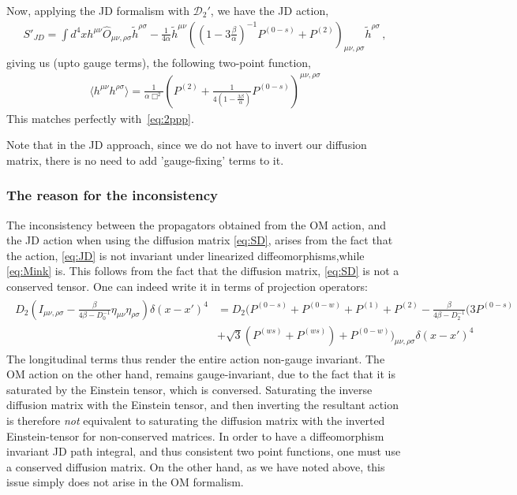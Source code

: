 \documentclass[aps,preprintnumbers,superscriptaddress,longbibliography]{revtex4-1}
\begin{document}
Now, applying the JD formalism with $\mathcal{D}_2'$, we have the JD action, \begin{align}
\label{eq:JD2}
    S'_{JD}=\int d^4x h^{\mu\nu}\hat{O}_{\mu\nu,\rho\sigma}\tilde{h}^{\rho\sigma}-\frac{1}{4\alpha}\tilde{h}^{\mu\nu}((1-3\frac{\beta}{\alpha})^{-1}P^{(0-s)}+P^{(2)})_{\mu\nu,\rho\sigma}\tilde{h}^{\rho\sigma}\, ,
\end{align} giving us (upto gauge terms), the following two-point function, 
\begin{align}
    \langle h^{\mu\nu}h^{\rho\sigma}\rangle=\frac{1}{\alpha\Box^2}(P^{(2)}+\frac{1}{4(1-\frac{3\beta}{\alpha})}P^{(0-s)})^{\mu\nu,\rho\sigma}
\end{align}
This matches perfectly with~\eqref{eq:2ppp}. 

Note that in the JD approach, since we do not have to invert our diffusion matrix, there is no need to add 'gauge-fixing' terms to it. 


\subsubsection{The reason for the inconsistency}

The inconsistency between the propagators obtained from the OM action, and the JD action when using the diffusion matrix \eqref{eq:SD}, arises from the fact that the action, \eqref{eq:JD} is not invariant under linearized diffeomorphisms,while \eqref{eq:Mink} is. This follows from the fact that the diffusion matrix, \eqref{eq:SD} is not a conserved tensor. One can indeed write it in terms of projection operators:
\begin{align}
\begin{split}
\label{eq:spindiff}
     D_2(I_{\mu\nu,\rho\sigma}-\frac{\beta}{4\beta-D^{-1}_0}\eta_{\mu\nu}\eta_{\rho\sigma})\delta(x-x')^{4}&=D_2(P^{(0-s)}+P^{(0-w)}+P^{(1)}+P^{(2)}-\frac{\beta}{4\beta-D^{-1}_2}(3P^{(0-s)}\\&+\sqrt{3}(P^{(ws)}+P^{(ws)})+P^{(0-w)})_{\mu\nu,\rho\sigma}\delta(x-x')^{4}
\end{split}
\end{align}
The longitudinal terms thus render the entire action non-gauge invariant. The OM action on the other hand, remains gauge-invariant, due to the fact that it is saturated by the Einstein tensor, which is conversed. Saturating the inverse diffusion matrix with the Einstein tensor, and then inverting the resultant action is therefore \textit{not} equivalent to saturating the diffusion matrix with the inverted Einstein-tensor for non-conserved matrices. In order to have a diffeomorphism invariant JD path integral, and thus consistent two point functions, one must use a conserved diffusion matrix. 
%
On the other hand, as we have noted above, this issue simply does not arise in the OM formalism.
\end{document}
